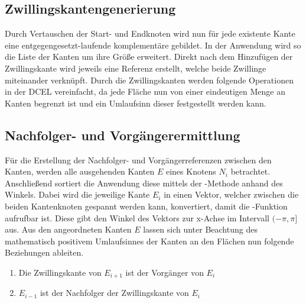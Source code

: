 \subsection{Zwillingskantengenerierung}
Durch Vertauschen der Start- und Endknoten wird nun für jede existente Kante eine entgegengesetzt-laufende komplementäre  gebildet.
In der Anwendung wird so die Liste der Kanten um ihre Größe erweitert.
Direkt nach dem Hinzufügen der Zwillingskante wird jeweils eine Referenz erstellt, welche beide Zwillinge miteinander verknüpft. 
Durch die Zwillingskanten werden folgende Operationen in der DCEL vereinfacht, da jede Fläche nun von einer eindeutigen Menge an Kanten begrenzt ist und ein Umlaufsinn dieser festgestellt werden kann.

\subsection{Nachfolger- und Vorgängerermittlung}
Für die Erstellung der Nachfolger- und Vorgängerreferenzen zwischen den Kanten, werden alle ausgehenden Kanten $E$ eines Knotens $N_i$ betrachtet.
Anschließend sortiert die Anwendung diese mittels der -Methode anhand des Winkels.
Dabei wird die jeweilige Kante $E_i$ in einen Vektor, welcher zwischen die beiden Kantenknoten gespannt werden kann, konvertiert, damit die -Funktion aufrufbar ist.
Diese gibt den Winkel des Vektors zur x-Achse im Intervall $(-\pi,\pi]$ aus.
Aus den angeordneten Kanten $E$ lassen sich unter Beachtung des mathematisch positivem Umlaufsinnes der Kanten an den Flächen nun folgende Beziehungen ableiten. 
\begin{enumerate}
	\item Die Zwillingskante von $E_{i+1}$ ist der Vorgänger von $E_i$
	\item $E_{i-1}$ ist der Nachfolger der Zwillingskante von $E_i$ 
\end{enumerate}
